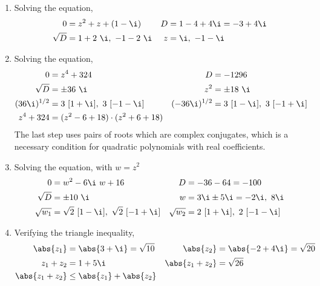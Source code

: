 \begin{enumerate}
    \item Solving the equation,
          \begin{align}
              0        & = z^2 + z + (1 - \i)     &
              D        & = 1 - 4 + 4\i = -3 + 4\i   \\
              \sqrt{D} & = 1 + 2\ \i,\ -1 -2\ \i  &
              z        & = \i,\ -1 - \i
          \end{align}

    \item Solving the equation,
          \begin{align}
              0             & = z^4 + 324                           &
              D             & = -1296                                 \\
              \sqrt{D}      & = \pm 36\ \i                          &
              z^2           & = \pm 18\ \i                            \\
              (36\i)^{1/2}  & = 3\ [1 + \i],\ 3\ [-1-\i]            &
              (-36\i)^{1/2} & = 3\ [1 - \i],\ 3\ [-1+\i]              \\
              z^4 + 324     & = (z^2 - 6 + 18) \cdot (z^2 + 6 + 18)
          \end{align}
          The last step uses pairs of roots which are complex conjugates, which is a
          necessary condition for quadratic polynomials with real coefficients.

    \item Solving the equation, with $ w = z^2 $
          \begin{align}
              0          & = w^2 - 6\i\ w + 16                        &
              D          & = -36 - 64 = -100                            \\
              \sqrt{D}   & = \pm 10\ \i                               &
              w          & = 3\i \pm 5\i = -2\i,\ 8\i                   \\
              \sqrt{w_1} & = \sqrt{2}\ [1 - \i],\ \sqrt{2}\ [-1 + \i] &
              \sqrt{w_2} & = 2\ [1 + \i],\ 2\ [-1 - \i]
          \end{align}

    \item Verifying the triangle inequality,
          \begin{align}
              \abs{z_1}       & = \abs{3 + \i} = \sqrt{10}   &
              \abs{z_2}       & = \abs{-2 + 4\i} = \sqrt{20}   \\
              z_1 + z_2       & = 1 + 5\i                    &
              \abs{z_1 + z_2} & = \sqrt{26}                    \\
              \abs{z_1 + z_2} & \leq \abs{z_1} + \abs{z_2}
          \end{align}


\end{enumerate}
